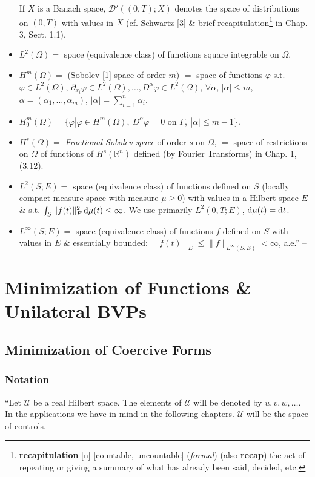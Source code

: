 \documentclass[oneside]{book}
\numberwithin{equation}{section}
\begin{document}
\begin{itemize}
	If $X$ is a Banach space, $\mathcal{D}'((0,T);X)$ denotes the space of distributions on $(0,T)$ with values in $X$ (cf. Schwartz [3] \& brief recapitulation\footnote{\textbf{recapitulation} [n] [countable, uncountable] (\textit{formal}) (also \textbf{recap}) the act of repeating or giving a summary of what has already been said, decided, etc.} in Chap. 3, Sect. 1.1).
	\item $L^2(\Omega) =$ space (equivalence class) of functions square integrable on $\Omega$.
	\item $H^m(\Omega) =$ (Sobolev [1] space of order $m$) $=$ space of functions $\varphi$ s.t. $\varphi\in L^2(\Omega)$, $\partial_{x_i}\varphi\in L^2(\Omega),\ldots,D^\alpha\varphi\in L^2(\Omega)$, $\forall\alpha$, $|\alpha|\le m$, $\alpha = (\alpha_1,\ldots,\alpha_m)$, $|\alpha| = \sum_{i=1}^n \alpha_i$.
	\item $H_0^m(\Omega) = \{\varphi|\varphi\in H^m(\Omega),\ D^\alpha\varphi = 0\mbox{ on }\Gamma,\ |\alpha|\le m - 1\}$.
	\item $H^s(\Omega) =$ \textit{Fractional Sobolev space} of order $s$ on $\Omega$, $=$ space of restrictions on $\Omega$ of functions of $H^s(\mathbb{R}^n)$ defined (by Fourier Transforms) in Chap. 1, (3.12).
	\item $L^2(S;E) =$ space (equivalence class) of functions defined on $S$ (locally compact measure space with measure $\mu\ge 0$) with values in a Hilbert space $E$ \& s.t. $\int_S \|f(t)\|_E^2\,{\rm d}\mu(t)\le\infty$. We use primarily $L^2(0,T;E)$, ${\rm d}\mu(t) = {\rm d}t$.
	\item $L^\infty(S;E) =$ space (equivalence class) of functions $f$ defined on $S$ with values in $E$ \& essentially bounded: $\|f(t)\|_E\le\|f\|_{L^\infty(S,E)} < \infty$, a.e.'' -- \cite[pp. 4--5]{Lions1971}
\end{itemize}

\section{Minimization of Functions \& Unilateral BVPs}

\subsection{Minimization of Coercive Forms}

\subsubsection{Notation}
``Let $\mathcal{U}$ be a real Hilbert space. The elements of $\mathcal{U}$ will be denoted by $u,v,w,\ldots$. In the applications we have in mind in the following chapters. $\mathcal{U}$ will be the space of controls.
\end{document}
